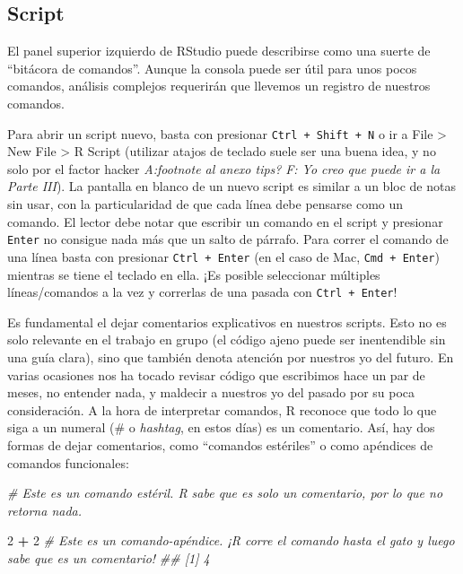 \documentclass[]{book}
\newenvironment{Shaded}{\begin{snugshade}}{\end{snugshade}}
\newcommand{\CommentTok}[1]{\textcolor[rgb]{0.56,0.35,0.01}{\textit{#1}}}
\newcommand{\DecValTok}[1]{\textcolor[rgb]{0.00,0.00,0.81}{#1}}
\newcommand{\OperatorTok}[1]{\textcolor[rgb]{0.81,0.36,0.00}{\textbf{#1}}}
\newcommand{\StringTok}[1]{\textcolor[rgb]{0.31,0.60,0.02}{#1}}
\begin{document}
\hypertarget{script}{%
\subsection{Script}\label{script}}

El panel superior izquierdo de RStudio puede describirse como una suerte
de ``bitácora de comandos''. Aunque la consola puede ser útil para unos
pocos comandos, análisis complejos requerirán que llevemos un registro
de nuestros comandos.

Para abrir un script nuevo, basta con presionar
\texttt{Ctrl\ +\ Shift\ +\ N} o ir a File \textgreater{} New File
\textgreater{} R Script (utilizar atajos de teclado suele ser una buena
idea, y no solo por el factor hacker \emph{A:footnote al anexo tips?}
\emph{F: Yo creo que puede ir a la Parte III}). La pantalla en blanco de
un nuevo script es similar a un bloc de notas sin usar, con la
particularidad de que cada línea debe pensarse como un comando. El
lector debe notar que escribir un comando en el script y presionar
\texttt{Enter} no consigue nada más que un salto de párrafo. Para correr
el comando de una línea basta con presionar \texttt{Ctrl\ +\ Enter} (en
el caso de Mac, \texttt{Cmd\ +\ Enter}) mientras se tiene el teclado en
ella. ¡Es posible seleccionar múltiples líneas/comandos a la vez y
correrlas de una pasada con \texttt{Ctrl\ +\ Enter}!

Es fundamental el dejar comentarios explicativos en nuestros scripts.
Esto no es solo relevante en el trabajo en grupo (el código ajeno puede
ser inentendible sin una guía clara), sino que también denota atención
por nuestros yo del futuro. En varias ocasiones nos ha tocado revisar
código que escribimos hace un par de meses, no entender nada, y maldecir
a nuestros yo del pasado por su poca consideración. A la hora de
interpretar comandos, R reconoce que todo lo que siga a un numeral (\# o
\emph{hashtag}, en estos días) es un comentario. Así, hay dos formas de
dejar comentarios, como ``comandos estériles'' o como apéndices de
comandos funcionales:

\begin{Shaded}
\begin{Highlighting}[]
\CommentTok{# Este es un comando estéril. R sabe que es solo un comentario, por lo que no retorna nada.}
\end{Highlighting}
\end{Shaded}

\begin{Shaded}
\begin{Highlighting}[]
\DecValTok{2} \OperatorTok{+}\StringTok{ }\DecValTok{2} \CommentTok{# Este es un comando-apéndice. ¡R corre el comando hasta el gato y luego sabe que es un comentario!}
\CommentTok{## [1] 4}
\end{Highlighting}
\end{Shaded}
\end{document}
